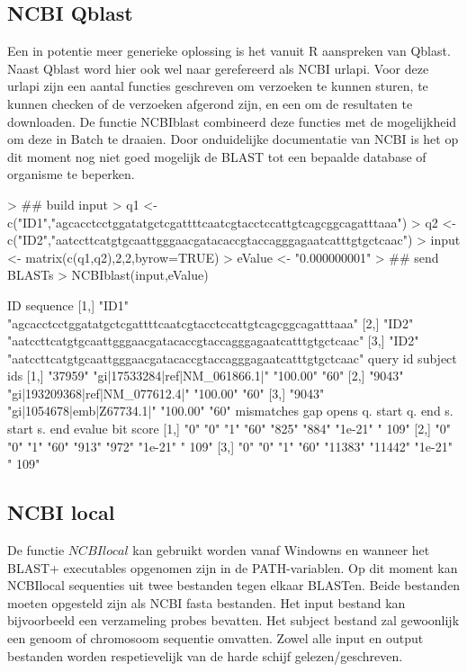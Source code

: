 \documentclass[a4paper]{article}
\begin{document}
\subsection*{NCBI Qblast}
Een in potentie meer generieke oplossing is het vanuit R aanspreken van Qblast\cite{qblast}. Naast Qblast word hier ook wel naar gerefereerd als NCBI urlapi. Voor deze urlapi zijn een aantal functies geschreven om verzoeken te kunnen sturen, te kunnen checken of de verzoeken afgerond zijn, en een om de resultaten te downloaden. De functie NCBIblast combineerd deze functies met de mogelijkheid om deze in Batch te draaien. Door onduidelijke documentatie van NCBI is het op dit moment nog niet goed mogelijk de BLAST tot een bepaalde database of organisme te beperken.
\begin{Schunk}
\begin{Sinput}
> ## build input
> q1 <- c("ID1","agcacctcctggatatgctcgattttcaatcgtacctccattgtcagcggcagatttaaa")
> q2 <- c("ID2","aatccttcatgtgcaattgggaacgatacaccgtaccagggagaatcatttgtgctcaac")
> input <- matrix(c(q1,q2),2,2,byrow=TRUE)
> eValue <- "0.000000001"
> ## send BLASTs
> NCBIblast(input,eValue)
\end{Sinput}
\begin{Soutput}
     ID    sequence                                                      
[1,] "ID1" "agcacctcctggatatgctcgattttcaatcgtacctccattgtcagcggcagatttaaa"
[2,] "ID2" "aatccttcatgtgcaattgggaacgatacaccgtaccagggagaatcatttgtgctcaac"
[3,] "ID2" "aatccttcatgtgcaattgggaacgatacaccgtaccagggagaatcatttgtgctcaac"
     query id subject ids                     % identity alignment length
[1,] "37959"  "gi|17533284|ref|NM_061866.1|"  "100.00"   "60"            
[2,] "9043"   "gi|193209368|ref|NM_077612.4|" "100.00"   "60"            
[3,] "9043"   "gi|1054678|emb|Z67734.1|"      "100.00"   "60"            
     mismatches gap opens q. start q. end s. start s. end  evalue  bit score
[1,] "0"        "0"       "1"      "60"   "825"    "884"   "1e-21" " 109"   
[2,] "0"        "0"       "1"      "60"   "913"    "972"   "1e-21" " 109"   
[3,] "0"        "0"       "1"      "60"   "11383"  "11442" "1e-21" " 109"   
\end{Soutput}
\end{Schunk}

\subsection*{NCBI local}
De functie $NCBIlocal$ kan gebruikt worden vanaf Windowns en wanneer het BLAST+ executables opgenomen zijn in de PATH-variablen. Op dit moment kan NCBIlocal sequenties uit twee bestanden tegen elkaar BLASTen. Beide bestanden moeten opgesteld zijn als NCBI fasta bestanden\cite{NCBIfasta}. Het input bestand kan bijvoorbeeld een verzameling probes bevatten. Het subject bestand zal gewoonlijk een genoom of chromosoom sequentie omvatten. Zowel alle input en output bestanden worden respetievelijk van de harde schijf gelezen/geschreven.
\end{document}
